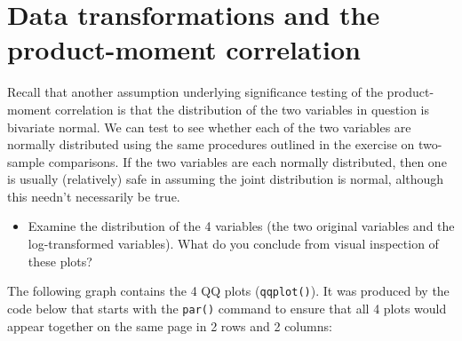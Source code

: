 \documentclass[
  12pt,
]{book}
\newenvironment{Shaded}{\begin{snugshade}}{\end{snugshade}}
\newcommand{\CommentTok}[1]{\textcolor[rgb]{0.56,0.35,0.01}{\textit{#1}}}
\newcommand{\DataTypeTok}[1]{\textcolor[rgb]{0.13,0.29,0.53}{#1}}
\newcommand{\DecValTok}[1]{\textcolor[rgb]{0.00,0.00,0.81}{#1}}
\newcommand{\KeywordTok}[1]{\textcolor[rgb]{0.13,0.29,0.53}{\textbf{#1}}}
\newcommand{\NormalTok}[1]{#1}
\newcommand{\OperatorTok}[1]{\textcolor[rgb]{0.81,0.36,0.00}{\textbf{#1}}}
\newcommand{\StringTok}[1]{\textcolor[rgb]{0.31,0.60,0.02}{#1}}
\providecommand{\tightlist}{%
  \setlength{\itemsep}{0pt}\setlength{\parskip}{0pt}}
\begin{document}
\hypertarget{data-transformations-and-the-product-moment-correlation}{%
\section{Data transformations and the product-moment correlation}\label{data-transformations-and-the-product-moment-correlation}}

Recall that another assumption underlying significance testing of the product-moment correlation is that the distribution of the two variables in question is bivariate normal. We can test to see whether each of the two variables are normally distributed using the same procedures outlined in the exercise on two-sample comparisons. If the two variables are each normally distributed, then one is usually (relatively) safe in assuming the joint distribution is normal, although this needn't necessarily be true.

\begin{itemize}
\tightlist
\item
  Examine the distribution of the 4 variables (the two original variables and the log-transformed variables). What do you conclude from visual inspection of these plots?
\end{itemize}

The following graph contains the 4 QQ plots (\texttt{qqplot()}). It was produced by the code below that starts with the \texttt{par()} command to ensure that all 4 plots would appear together on the same page in 2 rows and 2 columns:

\begin{Shaded}
\end{Shaded}
\end{document}
